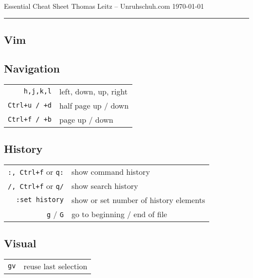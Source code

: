 

\author{Thomas Leitz (Unruhschuh.com)}
\date{\today}



\raggedcolumns

Essential Cheat Sheet\hfill
Thomas Leitz -- Unruhschuh.com\hfill
\today
\hrule
\vspace*{2pt}

\begin{multicols*}{3}
  

\centering

\section*{Vim}
\subsection*{Navigation}
\begin{tabular}{@{}rl@{}}
\verb|h,j,k,l|     & left, down, up, right \\
\verb|Ctrl+u / +d| & half page up / down \\
\verb|Ctrl+f / +b| & page up / down
\end{tabular}

\subsection*{History}
\begin{tabular}{@{}rl@{}}
\verb|:, Ctrl+f| or \verb|q:| & show command history \\
\verb|/, Ctrl+f| or \verb|q/| & show search history \\
\verb|:set history| & show or set number of history elements \\
\verb|g| / \verb|G| & go to beginning / end of file
\end{tabular}

\subsection*{Visual}
\begin{tabular}{@{}rl@{}}
\verb|gv| & reuse last selection
\end{tabular}


\end{multicols*}
